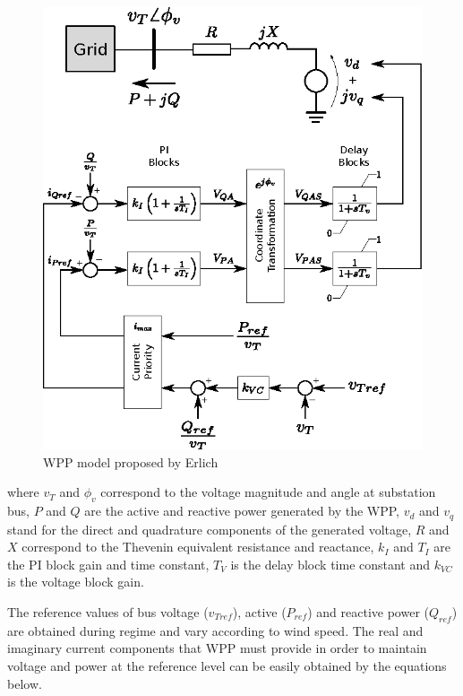 \begin{figure}[h]
	\caption{WPP model proposed by Erlich}
	\begin{center}
		\includegraphics[scale=1]{Images/ErlichModel.eps}
	\end{center}
	\label{fig: ErlMod}
\end{figure}

\noindent where $v_{T}$ and $\phi_{v}$ correspond to the voltage magnitude and angle at substation bus, $P$ and $Q$ are the active and reactive power generated by the WPP, $v_{d}$ and $v_{q}$ stand for the direct and quadrature components of the generated voltage, $R$ and $X$ correspond to the Thevenin equivalent resistance and reactance, $k_{I}$ and $T_{I}$ are the PI block gain and time constant, $T_{V}$ is the delay block time constant and $k_{VC}$ is the voltage block gain.

The reference values of bus voltage ($v_{Tref}$), active ($P_{ref}$) and reactive power ($Q_{ref}$) are obtained during regime and vary according to wind speed. The real and imaginary current components that WPP must provide in order to maintain voltage and power at the reference level can be easily obtained by the equations below.

